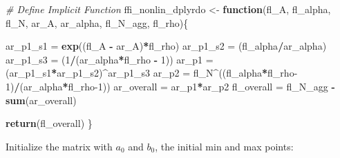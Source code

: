 \documentclass[
]{book}
\newenvironment{Shaded}{\begin{snugshade}}{\end{snugshade}}
\newcommand{\CommentTok}[1]{\textcolor[rgb]{0.56,0.35,0.01}{\textit{#1}}}
\newcommand{\ControlFlowTok}[1]{\textcolor[rgb]{0.13,0.29,0.53}{\textbf{#1}}}
\newcommand{\DecValTok}[1]{\textcolor[rgb]{0.00,0.00,0.81}{#1}}
\newcommand{\KeywordTok}[1]{\textcolor[rgb]{0.13,0.29,0.53}{\textbf{#1}}}
\newcommand{\NormalTok}[1]{#1}
\newcommand{\OperatorTok}[1]{\textcolor[rgb]{0.81,0.36,0.00}{\textbf{#1}}}
\newcommand{\StringTok}[1]{\textcolor[rgb]{0.31,0.60,0.02}{#1}}
\begin{document}
\begin{Shaded}
\begin{Highlighting}[]
\CommentTok{\# Define Implicit Function}
\NormalTok{ffi\_nonlin\_dplyrdo \textless{}{-}}\StringTok{ }\ControlFlowTok{function}\NormalTok{(fl\_A, fl\_alpha, fl\_N, ar\_A, ar\_alpha, fl\_N\_agg, fl\_rho)\{}

\NormalTok{  ar\_p1\_s1 =}\StringTok{ }\KeywordTok{exp}\NormalTok{((fl\_A }\OperatorTok{{-}}\StringTok{ }\NormalTok{ar\_A)}\OperatorTok{*}\NormalTok{fl\_rho)}
\NormalTok{  ar\_p1\_s2 =}\StringTok{ }\NormalTok{(fl\_alpha}\OperatorTok{/}\NormalTok{ar\_alpha)}
\NormalTok{  ar\_p1\_s3 =}\StringTok{ }\NormalTok{(}\DecValTok{1}\OperatorTok{/}\NormalTok{(ar\_alpha}\OperatorTok{*}\NormalTok{fl\_rho }\OperatorTok{{-}}\StringTok{ }\DecValTok{1}\NormalTok{))}
\NormalTok{  ar\_p1 =}\StringTok{ }\NormalTok{(ar\_p1\_s1}\OperatorTok{*}\NormalTok{ar\_p1\_s2)}\OperatorTok{\^{}}\NormalTok{ar\_p1\_s3}
\NormalTok{  ar\_p2 =}\StringTok{ }\NormalTok{fl\_N}\OperatorTok{\^{}}\NormalTok{((fl\_alpha}\OperatorTok{*}\NormalTok{fl\_rho}\DecValTok{{-}1}\NormalTok{)}\OperatorTok{/}\NormalTok{(ar\_alpha}\OperatorTok{*}\NormalTok{fl\_rho}\DecValTok{{-}1}\NormalTok{))}
\NormalTok{  ar\_overall =}\StringTok{ }\NormalTok{ar\_p1}\OperatorTok{*}\NormalTok{ar\_p2}
\NormalTok{  fl\_overall =}\StringTok{ }\NormalTok{fl\_N\_agg }\OperatorTok{{-}}\StringTok{ }\KeywordTok{sum}\NormalTok{(ar\_overall)}

  \KeywordTok{return}\NormalTok{(fl\_overall)}
\NormalTok{\}}
\end{Highlighting}
\end{Shaded}

Initialize the matrix with \(a_0\) and \(b_0\), the initial min and max points:
\end{document}
